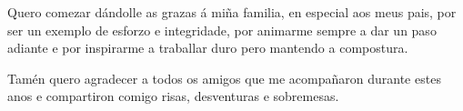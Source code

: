 \documentclass[11pt,a4paper,titlepage,oneside]{report}
\begin{document}

 
 \paxinaenbranco
 \begin{agradecementos}
Quero comezar dándolle as grazas á miña familia, en especial aos meus pais, por ser un exemplo de esforzo e integridade,
por animarme sempre a dar un paso adiante e por inspirarme a traballar duro pero mantendo a compostura.

\vspace{1em}
Tamén quero agradecer a todos os amigos que me acompañaron durante estes anos e compartiron comigo risas, desventuras e sobremesas.

 \end{agradecementos}
 

 \setcounter{page}{1}

 \tableofcontents
 \listoffigures
 \listoftables
 \clearpage
 
 \setcounter{page}{1}


 
 
 
 
 
 
 
 
 

 \appendix
 \appendixpage
 
%

 \printglossary[type=\acronymtype,title=\nomeglosarioacronimos]
 \printglossary[title=\nomeglosariotermos]

 
 
 \clearpage
 
\end{document}
